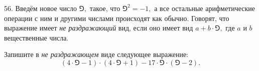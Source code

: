 56. Введём новое число $\Game,$ такое, что $\Game^2=-1,$ а все остальные арифметические операции с ним и другими числами происходят как обычно. Говорят, что выражение имеет {\it не раздражающий} вид, если оно имеет вид $a+b\cdot\Game,$ где $a$ и $b$ вещественные числа.

Запишите в {\it не раздражающем} виде следующее выражение:
$$(4\cdot\Game-1)\cdot(4\cdot\Game+1)-17\cdot\Game\cdot(\Game-2).$$
